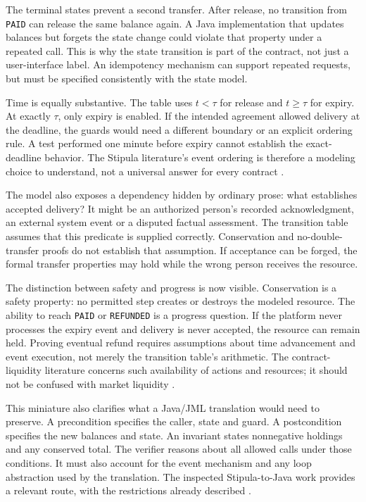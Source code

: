 The terminal states prevent a second transfer. After release, no transition from
\texttt{PAID} can release the same balance again. A Java implementation that
updates balances but forgets the state change could violate that property under
a repeated call. This is why the state transition is part of the contract, not
just a user-interface label. An idempotency mechanism can support repeated
requests, but must be specified consistently with the state model.


Time is equally substantive. The table uses $t<\tau$ for release and
$t\geq\tau$ for expiry. At exactly $\tau$, only expiry is enabled. If the intended
agreement allowed delivery at the deadline, the guards would need a different
boundary or an explicit ordering rule. A test performed one minute before expiry
cannot establish the exact-deadline behavior. The Stipula literature's event
ordering is therefore a modeling choice to understand, not a universal answer
for every contract \citep{stipula2021}.

The model also exposes a dependency hidden by ordinary prose: what establishes
accepted delivery? It might be an authorized person's recorded acknowledgment,
an external system event or a disputed factual assessment. The transition table
assumes that this predicate is supplied correctly. Conservation and no-double-
transfer proofs do not establish that assumption. If acceptance can be forged,
the formal transfer properties may hold while the wrong person receives the
resource.

The distinction between safety and progress is now visible. Conservation is a
safety property: no permitted step creates or destroys the modeled resource.
The ability to reach \texttt{PAID} or \texttt{REFUNDED} is a progress question.
If the platform never processes the expiry event and delivery is never accepted,
the resource can remain held. Proving eventual refund requires assumptions about
time advancement and event execution, not merely the transition table's arithmetic.
The contract-liquidity literature concerns such availability of actions and
resources; it should not be confused with market liquidity \citep{liquidity2023}.

This miniature also clarifies what a Java/JML translation would need to preserve.
A precondition specifies the caller, state and guard. A postcondition specifies
the new balances and state. An invariant states nonnegative holdings and any
conserved total. The verifier reasons about all allowed calls under those
conditions. It must also account for the event mechanism and any loop abstraction
used by the translation. The inspected Stipula-to-Java work provides a relevant
route, with the restrictions already described \citep{stipulakey2025}.

